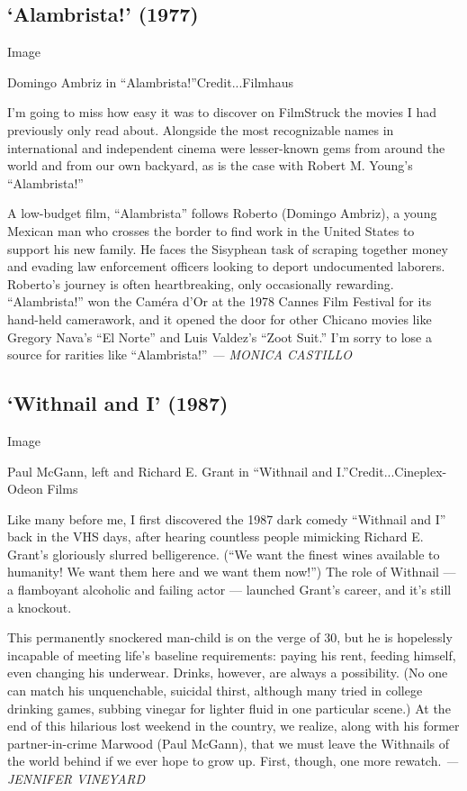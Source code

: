 \hypertarget{alambrista-1977}{%
\subsection{`Alambrista!' (1977)}\label{alambrista-1977}}

Image

Domingo Ambriz in ``Alambrista!''Credit...Filmhaus

I'm going to miss how easy it was to discover on FilmStruck the movies I
had previously only read about. Alongside the most recognizable names in
international and independent cinema were lesser-known gems from around
the world and from our own backyard, as is the case with Robert M.
Young's ``Alambrista!''

A low-budget film, ``Alambrista'' follows Roberto (Domingo Ambriz), a
young Mexican man who crosses the border to find work in the United
States to support his new family. He faces the Sisyphean task of
scraping together money and evading law enforcement officers looking to
deport undocumented laborers. Roberto's journey is often heartbreaking,
only occasionally rewarding. ``Alambrista!'' won the Caméra d'Or at the
1978 Cannes Film Festival for its hand-held camerawork, and it opened
the door for other Chicano movies like Gregory Nava's ``El Norte'' and
Luis Valdez's ``Zoot Suit.'' I'm sorry to lose a source for rarities
like ``Alambrista!'' \emph{--- MONICA CASTILLO}

\hypertarget{withnail-and-i-1987}{%
\subsection{`Withnail and I' (1987)}\label{withnail-and-i-1987}}

Image

Paul McGann, left and Richard E. Grant in ``Withnail and
I.''Credit...Cineplex-Odeon Films

Like many before me, I first discovered the 1987 dark comedy ``Withnail
and I'' back in the VHS days, after hearing countless people mimicking
Richard E. Grant's gloriously slurred belligerence. (``We want the
finest wines available to humanity! We want them here and we want them
now!'') The role of Withnail --- a flamboyant alcoholic and failing
actor --- launched Grant's career, and it's still a knockout.

This permanently snockered man-child is on the verge of 30, but he is
hopelessly incapable of meeting life's baseline requirements: paying his
rent, feeding himself, even changing his underwear. Drinks, however, are
always a possibility. (No one can match his unquenchable, suicidal
thirst, although many tried in college drinking games, subbing vinegar
for lighter fluid in one particular scene.) At the end of this hilarious
lost weekend in the country, we realize, along with his former
partner-in-crime Marwood (Paul McGann), that we must leave the Withnails
of the world behind if we ever hope to grow up. First, though, one more
rewatch. \emph{--- JENNIFER VINEYARD}

